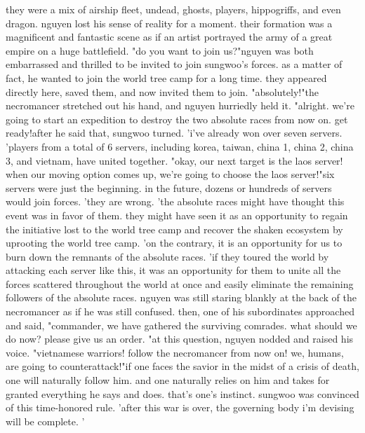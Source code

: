  they were a mix of airship fleet, undead, ghosts, players, hippogriffs, and even dragon.
nguyen lost his sense of reality for a moment.
 their formation was a magnificent and fantastic scene as if an artist portrayed the army of a great empire on a huge battlefield.
"do you want to join us?"nguyen was both embarrassed and thrilled to be invited to join sungwoo's forces.
 as a matter of fact, he wanted to join the world tree camp for a long time.
 they appeared directly here, saved them, and now invited them to join.
"absolutely!"the necromancer stretched out his hand, and nguyen hurriedly held it.
"alright.
 we're going to start an expedition to destroy the two absolute races from now on.
 get ready!after he said that, sungwoo turned.
'i've already won over seven servers.
'players from a total of 6 servers, including korea, taiwan, china 1, china 2, china 3, and vietnam, have united together.
 "okay, our next target is the laos server! when our moving option comes up, we're going to choose the laos server!"six servers were just the beginning.
 in the future, dozens or hundreds of servers would join forces.
'they are wrong.
'the absolute races might have thought this event was in favor of them.
they might have seen it as an opportunity to regain the initiative lost to the world tree camp and recover the shaken ecosystem by uprooting the world tree camp.
'on the contrary, it is an opportunity for us to burn down the remnants of the absolute races.
'if they toured the world by attacking each server like this, it was an opportunity for them to unite all the forces scattered throughout the world at once and easily eliminate the remaining followers of the absolute races.
nguyen was still staring blankly at the back of the necromancer as if he was still confused.
 then, one of his subordinates approached and said, "commander, we have gathered the surviving comrades.
 what should we do now? please give us an order.
"at this question, nguyen nodded and raised his voice.
"vietnamese warriors! follow the necromancer from now on! we, humans, are going to counterattack!"if one faces the savior in the midst of a crisis of death, one will naturally follow him.
 and one naturally relies on him and takes for granted everything he says and does.
 that's one's instinct.
 sungwoo was convinced of this time-honored rule.
 'after this war is over, the governing body i'm devising will be complete.
'

